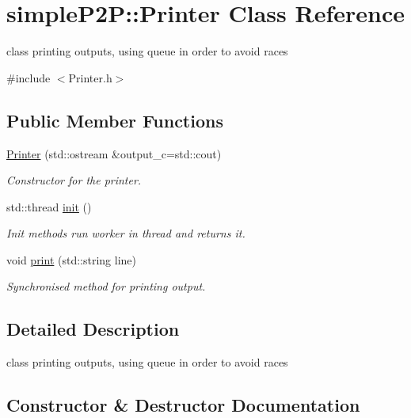 \hypertarget{classsimpleP2P_1_1Printer}{}\section{simple\+P2P\+:\+:Printer Class Reference}
\label{classsimpleP2P_1_1Printer}


class printing outputs, using queue in order to avoid races  




{\ttfamily \#include $<$Printer.\+h$>$}

\subsection*{Public Member Functions}
\begin{DoxyCompactItemize}
\item 
\hyperlink{classsimpleP2P_1_1Printer_ac18a99f5eab2c8c0b077063e5ed04916}{Printer} (std\+::ostream \&output\+\_\+c=std\+::cout)
\begin{DoxyCompactList}\small\item\em Constructor for the printer. \end{DoxyCompactList}\item 
std\+::thread \hyperlink{classsimpleP2P_1_1Printer_a9291e626c231334f26c305ab51e6cf19}{init} ()
\begin{DoxyCompactList}\small\item\em Init methods run worker in thread and returns it. \end{DoxyCompactList}\item 
void \hyperlink{classsimpleP2P_1_1Printer_a296b8acb2cf397eaab98087efd8959db}{print} (std\+::string line)
\begin{DoxyCompactList}\small\item\em Synchronised method for printing output. \end{DoxyCompactList}\end{DoxyCompactItemize}


\subsection{Detailed Description}
class printing outputs, using queue in order to avoid races 

\subsection{Constructor \& Destructor Documentation}
\mbox{\label{classsimpleP2P_1_1Printer_ac18a99f5eab2c8c0b077063e5ed04916}} 
